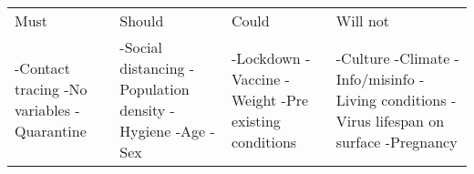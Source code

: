 \begin{center}

\begin{tabularx}{0.8\textwidth} { 
  | >{\raggedright\arraybackslash}X 
  | >{\raggedright\arraybackslash}X 
  | >{\raggedright\arraybackslash}X
  | >{\raggedright\arraybackslash}X| }

 \hline
 \multicolumn{4}{|c|}{Variables} \\
 \hline
  Must &  Should & Could & Will not \\
 \hline
 -Contact tracing \newline -No variables \newline -Quarantine 
 & -Social distancing \newline -Population density \newline -Hygiene \newline -Age \newline -Sex 
 & -Lockdown \newline -Vaccine \newline -Weight \newline -Pre existing conditions
 & -Culture \newline -Climate \newline -Info/misinfo \newline -Living conditions \newline -Virus lifespan on surface \newline -Pregnancy\\
\hline
\end{tabularx}

\end{center}